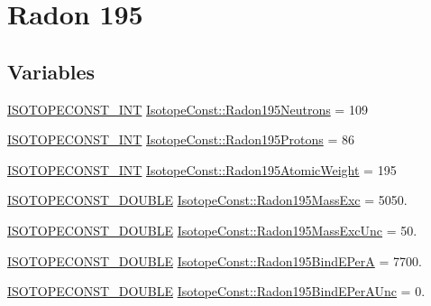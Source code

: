 \hypertarget{group___isotope_const-_radon-_rn195}{}\section{Radon 195}
\label{group___isotope_const-_radon-_rn195}
\subsection*{Variables}
\begin{DoxyCompactItemize}
\item 
\mbox{\hyperlink{group___isotope_const-_macros_ga5f18360b3e99483a35c32d789e62621c}{I\+S\+O\+T\+O\+P\+E\+C\+O\+N\+S\+T\+\_\+\+I\+NT}} \mbox{\hyperlink{group___isotope_const-_radon-_rn195_gad904c7c2ac9d9819dbfb0aff98ba9b4e}{Isotope\+Const\+::\+Radon195\+Neutrons}} = 109
\item 
\mbox{\hyperlink{group___isotope_const-_macros_ga5f18360b3e99483a35c32d789e62621c}{I\+S\+O\+T\+O\+P\+E\+C\+O\+N\+S\+T\+\_\+\+I\+NT}} \mbox{\hyperlink{group___isotope_const-_radon-_rn195_ga20772dc8e435f9ef2fe6b9ca7c9d9b3a}{Isotope\+Const\+::\+Radon195\+Protons}} = 86
\item 
\mbox{\hyperlink{group___isotope_const-_macros_ga5f18360b3e99483a35c32d789e62621c}{I\+S\+O\+T\+O\+P\+E\+C\+O\+N\+S\+T\+\_\+\+I\+NT}} \mbox{\hyperlink{group___isotope_const-_radon-_rn195_ga0ae5ccd65789bb6f5120d52b41aee27e}{Isotope\+Const\+::\+Radon195\+Atomic\+Weight}} = 195
\item 
\mbox{\hyperlink{group___isotope_const-_macros_ga8f45a7272ce02c0b4c65c44636ed719a}{I\+S\+O\+T\+O\+P\+E\+C\+O\+N\+S\+T\+\_\+\+D\+O\+U\+B\+LE}} \mbox{\hyperlink{group___isotope_const-_radon-_rn195_ga9bdc03f63d10a26d6aa54606208db426}{Isotope\+Const\+::\+Radon195\+Mass\+Exc}} = 5050.
\item 
\mbox{\hyperlink{group___isotope_const-_macros_ga8f45a7272ce02c0b4c65c44636ed719a}{I\+S\+O\+T\+O\+P\+E\+C\+O\+N\+S\+T\+\_\+\+D\+O\+U\+B\+LE}} \mbox{\hyperlink{group___isotope_const-_radon-_rn195_ga3ab5fec0342506feba1e9a6101731c0d}{Isotope\+Const\+::\+Radon195\+Mass\+Exc\+Unc}} = 50.
\item 
\mbox{\hyperlink{group___isotope_const-_macros_ga8f45a7272ce02c0b4c65c44636ed719a}{I\+S\+O\+T\+O\+P\+E\+C\+O\+N\+S\+T\+\_\+\+D\+O\+U\+B\+LE}} \mbox{\hyperlink{group___isotope_const-_radon-_rn195_ga7471edaeb746d2ca7301ea12ea38c7d5}{Isotope\+Const\+::\+Radon195\+Bind\+E\+PerA}} = 7700.
\item 
\mbox{\hyperlink{group___isotope_const-_macros_ga8f45a7272ce02c0b4c65c44636ed719a}{I\+S\+O\+T\+O\+P\+E\+C\+O\+N\+S\+T\+\_\+\+D\+O\+U\+B\+LE}} \mbox{\hyperlink{group___isotope_const-_radon-_rn195_ga71548c8b5f90eed7e8b8040bffbac9cb}{Isotope\+Const\+::\+Radon195\+Bind\+E\+Per\+A\+Unc}} = 0.

\end{DoxyCompactItemize}
